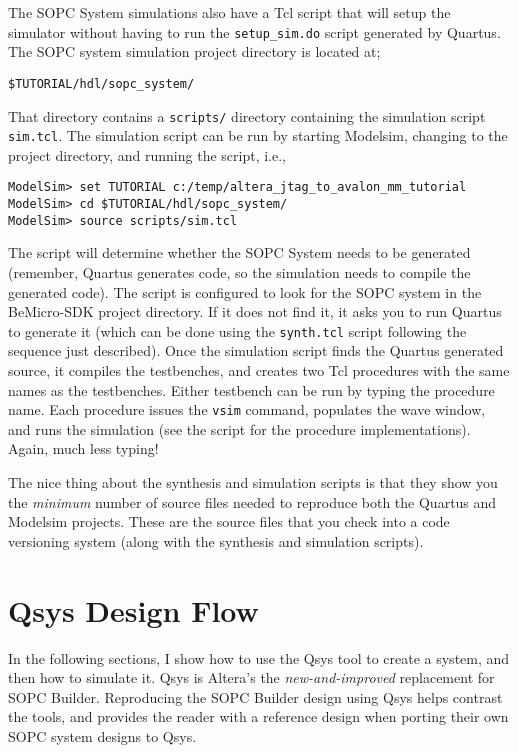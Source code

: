 \documentclass[10pt,twoside]{article}
\begin{document}
The SOPC System simulations also have a Tcl script that will
setup the simulator without having to run the \verb+setup_sim.do+
script generated by Quartus.
%
The SOPC system simulation project directory is located at;
%
\begin{verbatim}
$TUTORIAL/hdl/sopc_system/
\end{verbatim}
%
That directory contains a \verb+scripts/+ directory containing
the simulation script \verb+sim.tcl+.
The simulation script can be run by starting Modelsim,
changing to the project directory, and running the script, i.e.,
%
\begin{verbatim}
ModelSim> set TUTORIAL c:/temp/altera_jtag_to_avalon_mm_tutorial
ModelSim> cd $TUTORIAL/hdl/sopc_system/
ModelSim> source scripts/sim.tcl
\end{verbatim}
%
The script will determine whether the SOPC System needs to be
generated (remember, Quartus generates code, so the simulation
needs to compile the generated code). The script is configured
to look for the SOPC system in the BeMicro-SDK project directory.
If it does not find it, it asks you to run Quartus to generate
it (which can be done using the \verb+synth.tcl+ script following
the sequence just described). Once the simulation script finds the Quartus
generated source, it compiles the testbenches, and creates two
Tcl procedures with the same names as the testbenches.
Either testbench can be run by typing the procedure name.
Each procedure issues the \verb+vsim+ command, populates the
wave window, and runs the simulation (see the script
for the procedure implementations). Again, much less typing!

The nice thing about the synthesis and simulation scripts is
that they show you the {\em minimum} number of source files needed
to reproduce both the Quartus and Modelsim projects. These are
the source files that you check into a code versioning system
(along with the synthesis and simulation scripts).

\clearpage
\section{Qsys Design Flow}

In the following sections, I show how to use the Qsys tool to
create a system, and then how to simulate it. Qsys is Altera's
the {\em new-and-improved} replacement for SOPC Builder. 
Reproducing the SOPC Builder design using Qsys helps contrast
the tools, and provides the reader with a reference design when
porting their own SOPC system designs to Qsys.
\end{document}
